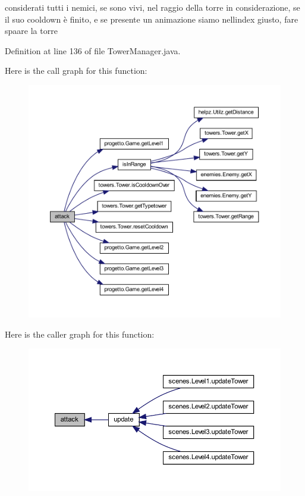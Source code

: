 considerati tutti i nemici, se sono vivi, nel raggio della torre in considerazione, se il suo cooldown è finito, e se presente un animazione siamo nell\textquotesingle{}index giusto, fare spaare la torre 



Definition at line 136 of file Tower\+Manager.\+java.

Here is the call graph for this function\+:
\nopagebreak
\begin{figure}[H]
\begin{center}
\leavevmode
\includegraphics[width=350pt]{classmanagers_1_1_tower_manager_a337d987717311ab51a124a11a059f66c_cgraph}
\end{center}
\end{figure}
Here is the caller graph for this function\+:
\nopagebreak
\begin{figure}[H]
\begin{center}
\leavevmode
\includegraphics[width=350pt]{classmanagers_1_1_tower_manager_a337d987717311ab51a124a11a059f66c_icgraph}
\end{center}
\end{figure}
\mbox{\label{classmanagers_1_1_tower_manager_a72fe1ffca978e99fd16994a10e7f8051}} 
